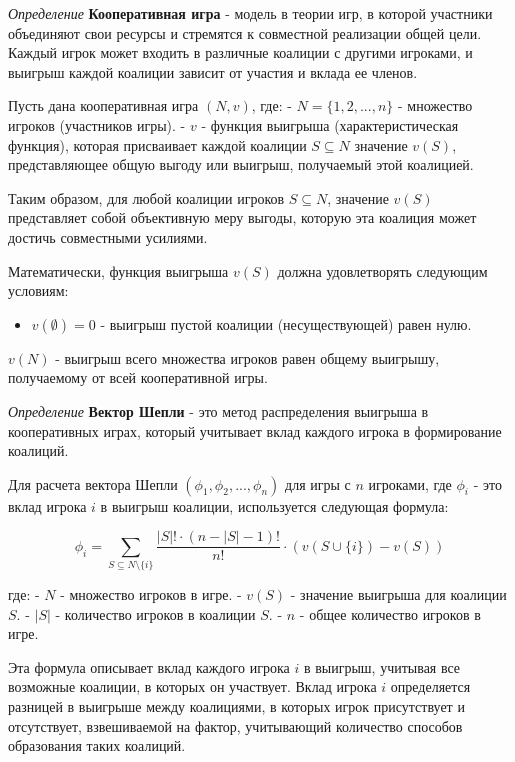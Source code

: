 \textit{Определение} \textbf{Кооперативная игра} - модель в теории игр, в которой участники  объединяют свои ресурсы и стремятся к совместной реализации общей цели. Каждый игрок может входить в различные коалиции с другими игроками, и выигрыш каждой коалиции зависит от участия и вклада ее членов.

Пусть дана кооперативная игра \( (N, v) \), где:
- \( N = \{1, 2, ..., n\} \) - множество игроков (участников игры).
- \( v \) - функция выигрыша (характеристическая функция), которая присваивает каждой коалиции \( S \subseteq N \) значение \( v(S) \), представляющее общую выгоду или выигрыш, получаемый этой коалицией.


Таким образом, для любой коалиции игроков \( S \subseteq N \), значение \( v(S) \) представляет собой объективную меру выгоды, которую эта коалиция может достичь совместными усилиями.


Математически, функция выигрыша \( v(S) \) должна удовлетворять следующим условиям:\
\begin{itemize}
    \item \( v(\emptyset) = 0 \) - выигрыш пустой коалиции (несуществующей) равен нулю.
\end{itemize} \( v(N) \) - выигрыш всего множества игроков равен общему выигрышу, получаемому от всей кооперативной игры.

\textit{Определение} \textbf{Вектор Шепли }- это метод распределения выигрыша в кооперативных играх, который учитывает вклад каждого игрока в формирование коалиций. 

Для расчета вектора Шепли \( (\phi_1, \phi_2, ..., \phi_n) \) для игры с \( n \) игроками, где \( \phi_i \) - это вклад игрока \( i \) в выигрыш коалиции, используется следующая формула:

\[
\phi_i = \sum_{S \subseteq N \setminus \{i\}} \frac{|S|! \cdot (n - |S| - 1)!}{n!} \cdot (v(S \cup \{i\}) - v(S))
\]

где:
- \( N \) - множество игроков в игре.
- \( v(S) \) - значение выигрыша для коалиции \( S \).
- \( |S| \) - количество игроков в коалиции \( S \).
- \( n \) - общее количество игроков в игре.

Эта формула описывает вклад каждого игрока \( i \) в выигрыш, учитывая все возможные коалиции, в которых он участвует. Вклад игрока \( i \) определяется разницей в выигрыше между коалициями, в которых игрок присутствует и отсутствует, взвешиваемой на фактор, учитывающий количество способов образования таких коалиций.
